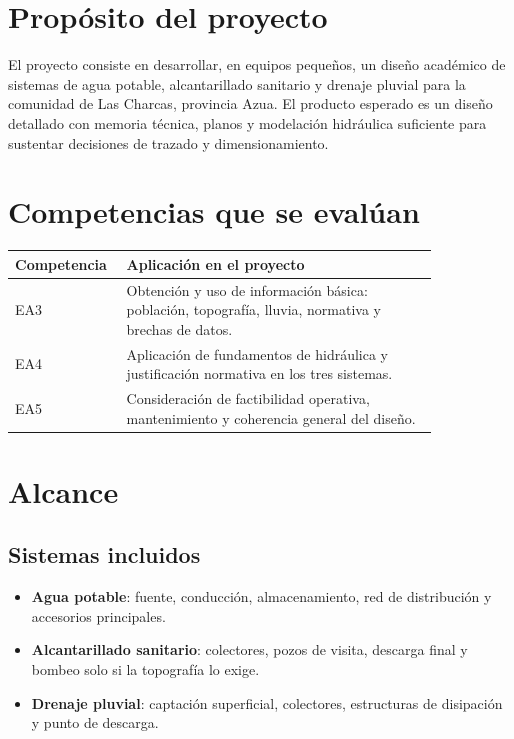\documentclass[11pt]{article}
\begin{document}

\section{Prop\'osito del proyecto}
El proyecto consiste en desarrollar, en equipos peque\~nos, un dise\~no acad\'emico de sistemas de agua potable, alcantarillado sanitario y drenaje pluvial para la comunidad de Las Charcas, provincia Azua. El producto esperado es un dise\~no detallado con memoria t\'ecnica, planos y modelaci\'on hidr\'aulica suficiente para sustentar decisiones de trazado y dimensionamiento.

\section{Competencias que se eval\'uan}
\begin{center}
\begin{tabular}{p{0.16\linewidth} p{0.68\linewidth}}
\toprule
\textbf{Competencia} & \textbf{Aplicaci\'on en el proyecto} \\
\midrule
EA3 & Obtenci\'on y uso de informaci\'on b\'asica: poblaci\'on, topograf\'ia, lluvia, normativa y brechas de datos. \\
EA4 & Aplicaci\'on de fundamentos de hidr\'aulica y justificaci\'on normativa en los tres sistemas. \\
EA5 & Consideraci\'on de factibilidad operativa, mantenimiento y coherencia general del dise\~no. \\
\bottomrule
\end{tabular}
\end{center}

\section{Alcance}
\subsection{Sistemas incluidos}
\begin{itemize}
\item \textbf{Agua potable}: fuente, conducci\'on, almacenamiento, red de distribuci\'on y accesorios principales.
\item \textbf{Alcantarillado sanitario}: colectores, pozos de visita, descarga final y bombeo solo si la topograf\'ia lo exige.
\item \textbf{Drenaje pluvial}: captaci\'on superficial, colectores, estructuras de disipaci\'on y punto de descarga.
\end{itemize}
\end{document}
